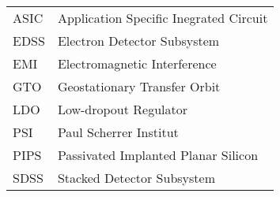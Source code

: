 \begin{tabular}{p{4cm}p{12cm}}
	ASIC & Application Specific Inegrated Circuit \\
	EDSS & Electron Detector Subsystem \\
	EMI & Electromagnetic Interference \\
	GTO & Geostationary Transfer Orbit \\
	LDO & Low-dropout Regulator \\
	PSI & Paul Scherrer Institut \\
	PIPS & Passivated Implanted Planar Silicon \\
	SDSS & Stacked Detector Subsystem \\
\end{tabular}

